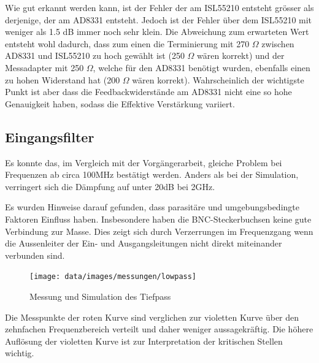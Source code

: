 Wie gut erkannt werden kann, ist der Fehler der am ISL55210 entsteht grösser als derjenige, der am AD8331 entsteht. Jedoch ist der Fehler über dem ISL55210 mit weniger als 1.5 dB immer noch sehr klein. Die Abweichung zum erwarteten Wert entsteht wohl dadurch, dass zum einen die Terminierung mit 270 $\Omega$ zwischen AD8331 und ISL55210 zu hoch gewählt ist (250 $\Omega$ wären korrekt) und der Messadapter mit 250 $\Omega$, welche für den AD8331 benötigt wurden, ebenfalls einen zu hohen Widerstand hat (200 $\Omega$ wären korrekt). Wahrscheinlich der wichtigste Punkt ist aber dass die Feedbackwiderstände am AD8331 nicht eine so hohe Genauigkeit haben, sodass die Effektive Verstärkung variiert.

\newpage
\subsection{Eingangsfilter}
Es konnte das, im Vergleich mit der Vorgängerarbeit, gleiche Problem bei Frequenzen ab circa 100MHz bestätigt werden. Anders als bei der Simulation, verringert sich die Dämpfung auf unter 20dB bei 2GHz.

Es wurden Hinweise darauf gefunden, dass parasitäre und umgebungsbedingte Faktoren Einfluss haben. Insbesondere haben die BNC-Steckerbuchsen keine gute Verbindung zur Masse. Dies zeigt sich durch Verzerrungen im Frequenzgang wenn die Aussenleiter der Ein- und Ausgangsleitungen nicht direkt miteinander verbunden sind.

\begin{figure}[H]
	\begin{center}
		\texttt{[image: data/images/messungen/lowpass]}
		\caption{Messung und Simulation des Tiefpass}
		\label{fig:lowpass-plot}
	\end{center}
\end{figure}

Die Messpunkte der roten Kurve sind verglichen zur violetten Kurve über den zehnfachen Frequenzbereich verteilt und daher weniger aussagekräftig. Die höhere Auflösung der violetten Kurve ist zur Interpretation der kritischen Stellen wichtig.
